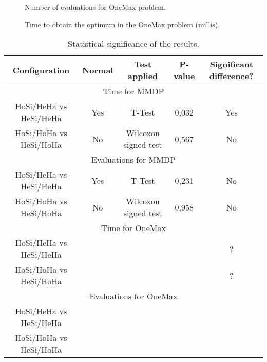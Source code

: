 \documentclass{sig-alternate}
\begin{document}
\begin{figure}
\centering
{}
\caption{Number of evaluations for OneMax problem.}
\end{figure}

\begin{figure}
\centering
{}
\caption{Time to obtain the optimum in the OneMax problem (millis).}
\end{figure}


\begin{table*}
\centering
\caption{Statistical significance of the results.}
\begin{tabular}{|c|c|c|c|c|} \hline

Configuration			&Normal	&Test applied			&P-value & Significant difference?\\ \hline
\multicolumn{5}{|c|}{Time for MMDP} \\ \hline
HoSi/HeHa vs HeSi/HeHa	&Yes	&T-Test					&0,032 	 & Yes \\ \hline
HoSi/HoHa vs HeSi/HoHa	&No		&Wilcoxon signed test	&0,567 	 & No \\ \hline
\multicolumn{5}{|c|}{Evaluations for MMDP}	\\ \hline
HoSi/HeHa vs HeSi/HeHa	&Yes	&T-Test					&0,231  & No \\ \hline
HoSi/HoHa vs HeSi/HoHa	&No		&Wilcoxon signed test	&0,958  & No \\ \hline
\multicolumn{5}{|c|}{Time for OneMax} \\ \hline
HoSi/HeHa vs HeSi/HeHa	&		&						& 	& ? \\ \hline
HoSi/HoHa vs HeSi/HoHa	&		&						& 	& ? \\ \hline
\multicolumn{5}{|c|}{Evaluations for OneMax}	\\ \hline
HoSi/HeHa vs HeSi/HeHa	&		& 						&		& \\ \hline
HoSi/HoHa vs HeSi/HoHa	&		&						&		& \\ \hline
\end{tabular}
\label{tab:significance}
\end{table*}

\end{document}
